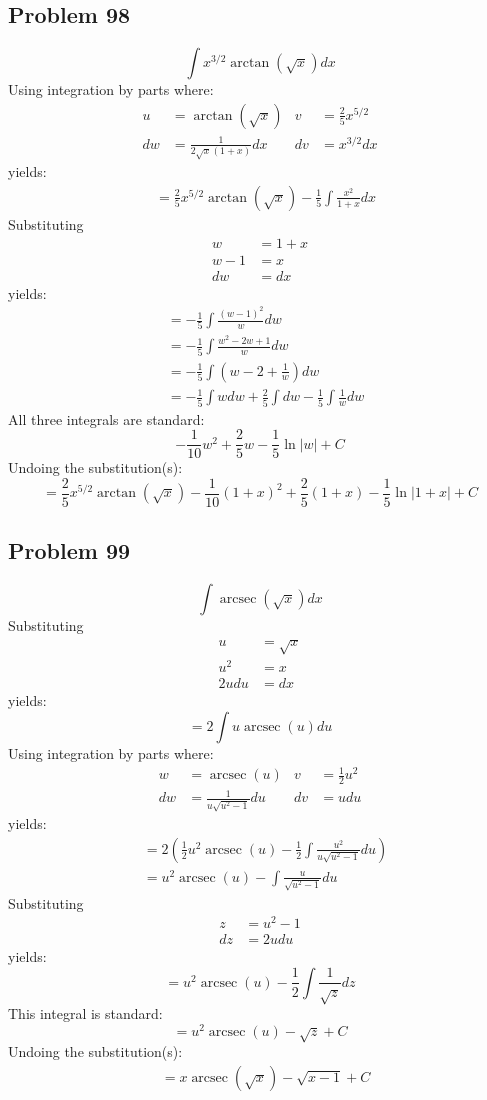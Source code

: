 \documentclass{article}
\DeclareMathOperator{\arcsec}{arcsec}
\begin{document}
\subsection*{Problem 98}
$$\int x^{3/2}\arctan\left(\sqrt{x}\right)dx$$
Using integration by parts where:
\begin{align*}
u&=\arctan\left(\sqrt{x}\right) &v&=\frac{2}{5}x^{5/2} \\
dw&=\frac{1}{2\sqrt{x}(1+x)}dx &dv&=x^{3/2}dx
\end{align*}
yields:
\begin{align*}
&=\frac{2}{5}x^{5/2}\arctan\left(\sqrt{x}\right)-\frac{1}{5}\int\frac{x^2}{1+x}dx
\end{align*}
Substituting
\begin{align*}
w&=1+x \\
w-1&=x \\
dw&=dx
\end{align*}
yields:
\begin{align*}
&=-\frac{1}{5}\int\frac{(w-1)^2}{w}dw \\
&=-\frac{1}{5}\int\frac{w^2-2w+1}{w}dw \\
&=-\frac{1}{5}\int\left(w-2+\frac{1}{w}\right)dw \\
&=-\frac{1}{5}\int wdw+\frac{2}{5}\int dw-\frac{1}{5}\int\frac{1}{w}dw
\end{align*}
All three integrals are standard:
$$-\frac{1}{10}w^2+\frac{2}{5}w-\frac{1}{5}\ln|w|+C$$
Undoing the substitution(s):
$$=\frac{2}{5}x^{5/2}\arctan\left(\sqrt{x}\right)-\frac{1}{10}(1+x)^2+\frac{2}{5}(1+x)-\frac{1}{5}\ln|1+x|+C$$
\subsection*{Problem 99}
$$\int\arcsec\left(\sqrt{x}\right)dx$$
Substituting
\begin{align*}
u&=\sqrt{x} \\
u^2&=x \\
2udu&=dx
\end{align*}
yields:
$$=2\int u\arcsec(u)du$$
Using integration by parts where:
\begin{align*}
w&=\arcsec(u) &v&=\frac{1}{2}u^2 \\
dw&=\frac{1}{u\sqrt{u^2-1}}du &dv&=udu
\end{align*}
yields:
\begin{align*}
&=2\left(\frac{1}{2}u^2\arcsec(u)-\frac{1}{2}\int\frac{u^2}{u\sqrt{u^2-1}}du\right) \\
&=u^2\arcsec(u)-\int\frac{u}{\sqrt{u^2-1}}du
\end{align*}
Substituting
\begin{align*}
z&=u^2-1 \\
dz&=2udu
\end{align*}
yields:
$$=u^2\arcsec(u)-\frac{1}{2}\int\frac{1}{\sqrt{z}}dz$$
This integral is standard:
$$=u^2\arcsec(u)-\sqrt{z}+C$$
Undoing the substitution(s):
\begin{align*}
&=x\arcsec\left(\sqrt{x}\right)-\sqrt{x-1}+C
\end{align*}
\end{document}
